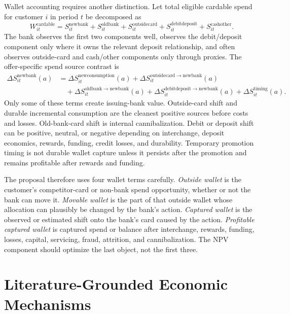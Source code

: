 \documentclass[11pt]{article}
\newcommand{\1}{\mathbf{1}}
\begin{document}
Wallet accounting requires another distinction. Let total eligible cardable
spend for customer $i$ in period $t$ be decomposed as
\begin{equation}
  W_{it}^{\mathrm{cardable}}
  =
  S_{it}^{\mathrm{newbank}}
  +S_{it}^{\mathrm{oldbank}}
  +S_{it}^{\mathrm{outsidecard}}
  +S_{it}^{\mathrm{debitdeposit}}
  +S_{it}^{\mathrm{cashother}}.
  \label{eq:wallet-accounting}
\end{equation}
The bank observes the first two components well, observes the debit/deposit
component only where it owns the relevant deposit relationship, and often
observes outside-card and cash/other components only through proxies. The
offer-specific spend source contrast is
\begin{align}
  \Delta S_{it}^{\mathrm{newbank}}(a)
  &=
  \Delta S_{it}^{\mathrm{newconsumption}}(a)
  +\Delta S_{it}^{\mathrm{outsidecard\rightarrow newbank}}(a)
  \nonumber\\
  &\quad
  +\Delta S_{it}^{\mathrm{oldbank\rightarrow newbank}}(a)
  +\Delta S_{it}^{\mathrm{debitdeposit\rightarrow newbank}}(a)
  +\Delta S_{it}^{\mathrm{timing}}(a).
  \label{eq:spend-source-panel}
\end{align}
Only some of these terms create issuing-bank value. Outside-card shift and
durable incremental consumption are the cleanest positive sources before
costs and losses. Old-bank-card shift is internal cannibalization. Debit or
deposit shift can be positive, neutral, or negative depending on interchange,
deposit economics, rewards, funding, credit losses, and durability. Temporary
promotion timing is not durable wallet capture unless it persists after the
promotion and remains profitable after rewards and funding.

The proposal therefore uses four wallet terms carefully. \emph{Outside wallet}
is the customer's competitor-card or non-bank spend opportunity, whether or
not the bank can move it. \emph{Movable wallet} is the part of that outside
wallet whose allocation can plausibly be changed by the bank's action.
\emph{Captured wallet} is the observed or estimated shift onto the bank's card
caused by the action. \emph{Profitable captured wallet} is captured spend or
balance after interchange, rewards, funding, losses, capital, servicing, fraud,
attrition, and cannibalization. The NPV component should optimize the last
object, not the first three.


\section{Literature-Grounded Economic Mechanisms}
\label{sec:v2-literature-mechanisms}
\end{document}
